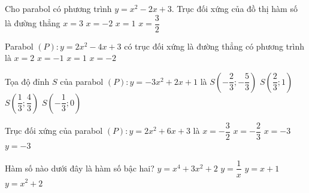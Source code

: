

\begin{ex}%
	Cho  parabol có phương trình $y=x^2-2x+3$. Trục đối xứng của đồ thị hàm số là đường thẳng
	\choice 
		 {$x=3$}
		 {$x=-2$}
		{\True  $x=1$}
		{$x=\dfrac{3}{2}$} 
\end{ex}

\begin{ex}%
	Parabol $\left(P\right)\colon y=2x^2-4x+3$ có trục đối xứng là  đường thẳng có phương trình là
	 \choice
		{$x=2$} 
		{$x=-1$} 
		 {\True $x=1$}
		 {$x=-2$}
\end{ex}

\begin{ex}%
	Tọa độ đỉnh $S$ của parabol $\left(P\right)\colon  y=-3x^2+2x+1$ là
	 \choice
		 {$S\left( -\dfrac{2}{3}; -\dfrac{5}{3} \right)$}
		 {$S\left( \dfrac{2}{3}; 1 \right)$}
		{\True $S\left( \dfrac{1}{3}; \dfrac{4}{3}  \right)$}
		{$S\left(  -\dfrac{1}{3}; 0 \right)$}
\end{ex}

\begin{ex}%
	Trục đối xứng của  parabol $(P)\colon y=2x^2+6x+3$ là
	\choice 
		 {\True $x=-\dfrac{3}{2}$}
		 {$x=-\dfrac{2}{3}$}
		{$x=-3$} 
		{$y=-3$} 
\end{ex}

\begin{ex}%
	Hàm số nào dưới đây là  hàm số bậc hai?
	 \choice
		 {$y=x^4+3x^2+2$}
		{$y=\dfrac{1}{x}$} 
		{$y=x+1$} 
		{\True $y=x^2+2$} 
\end{ex}

